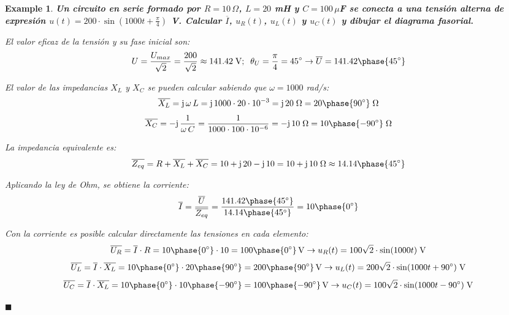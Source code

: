 \documentclass[11pt]{book} %
\numberwithin{dummy}{section}
\theoremstyle{ocrenumbox}
\theoremstyle{blacknumex}
\newtheorem{exampleT}{Example}[chapter]
\theoremstyle{blacknumbox}
\theoremstyle{ocrenum}
\newenvironment{example}{\begin{exampleT}}{\hfill{\tiny\ensuremath{\blacksquare}}\end{exampleT}}
\begin{document}
	\vspace{4mm}
	\begin{example}\label{ej.2-3}
		\textbf{Un circuito en serie formado por $R=10\,\Omega$, $L=20$ mH y $C=100\,\mu$F se conecta a una tensión alterna de expresión $u(t)=200\cdot\sin(1000t+\frac{\pi}{4})$ V. Calcular $\overline{I}$, ${u_R(t)}$, $u_L(t)$ y $u_C(t)$ y dibujar el diagrama fasorial.}
		
		El valor eficaz de la tensión y su fase inicial son:
		\begin{equation*}
			U=\dfrac{U_{max}}{\sqrt{2}}=\dfrac{200}{\sqrt{2}}\approx 141.42\;\text{V};\;\;\theta_U=\dfrac{\pi}{4}=45^\circ \rightarrow \overline{U}=141.42\phase{45^\circ}
		\end{equation*}
		
		El valor de las impedancias $X_L$ y $X_C$ se pueden calcular sabiendo que $\omega=1000$ rad/s:
		\begin{equation*}
			\overline{X_L}=\mathrm{j}\,\omega\,L=\mathrm{j}\,1000\cdot20\cdot 10^{-3}= \mathrm{j}\,20\;\Omega=20\phase{90^\circ}\;\Omega
		\end{equation*}
		\begin{equation*}
			\overline{X_C}=-\mathrm{j}\,\dfrac{1}{\omega\,C}=\dfrac{1}{1000\cdot100\cdot 10^{-6}}= -\mathrm{j}\,10\;\Omega=10\phase{-90^\circ}\;\Omega
		\end{equation*}
		
		La impedancia equivalente es:
		\begin{equation*}
			\overline{Z_{eq}}=R+\overline{X_L}+\overline{X_C}=10+\mathrm{j}\,20-\mathrm{j}\,10=10+\mathrm{j}\,10\;\Omega\approx 14.14\phase{45^\circ}
		\end{equation*}
		
		Aplicando la ley de Ohm, se obtiene la corriente:
		\begin{equation*}
			\overline{I}=\dfrac{\overline{U}}{\overline{Z_{eq}}}=\dfrac{141.42\phase{45^\circ}}{14.14\phase{45^\circ}}=10\phase{0^\circ}
		\end{equation*}
		
		Con la corriente es posible calcular directamente las tensiones en cada elemento: 
		\begin{equation*}
			\overline{U_R}=\overline{I}\cdot R=10\phase{0^\circ}\cdot 10=100\phase{0^\circ}\,\text{V}\rightarrow u_R(t)=100\sqrt{2}\cdot\sin(1000t)\;\text{V}
		\end{equation*}
		\begin{equation*}
			\overline{U_L}=\overline{I}\cdot \overline{X_L}=10\phase{0^\circ}\cdot 20\phase{90^\circ}=200\phase{90^\circ}\,\text{V}\rightarrow u_L(t)=200\sqrt{2}\cdot\sin(1000t+90^\circ)\;\text{V}
		\end{equation*}
		\begin{equation*}
			\overline{U_C}=\overline{I}\cdot \overline{X_L}=10\phase{0^\circ}\cdot 10\phase{-90^\circ} =100\phase{-90^\circ}\,\text{V}\rightarrow u_C(t)=100\sqrt{2}\cdot\sin(1000t-90^\circ)\;\text{V}
		\end{equation*}
		

\end{example}
\end{document}
